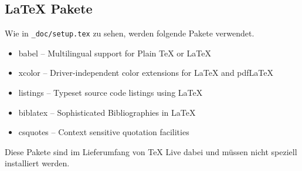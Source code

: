 \subsection{LaTeX Pakete}
Wie in \verb|_doc/setup.tex| zu sehen, werden folgende Pakete verwendet.
\begin{itemize}
    \item babel -- Multilingual support for Plain TeX or LaTeX
    \item xcolor -- Driver-independent color extensions for LaTeX and pdfLaTeX
    \item listings -- Typeset source code listings using LaTeX
    \item biblatex -- Sophisticated Bibliographies in LaTeX
    \item csquotes -- Context sensitive quotation facilities
\end{itemize}
Diese Pakete sind im Lieferumfang von TeX Live dabei und müssen nicht speziell installiert werden.
